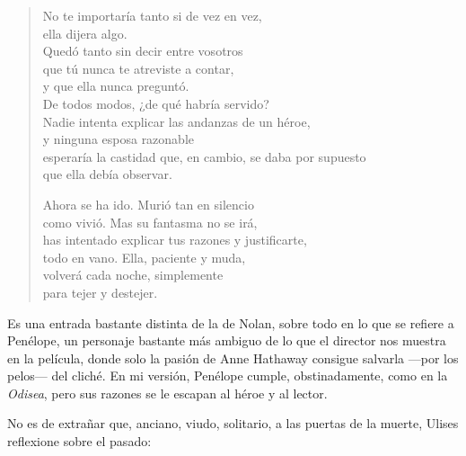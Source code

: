 \documentclass[11pt,a4paper]{article}
\begin{document}
\begin{verse}
No te importaría tanto si de vez en vez,\\
ella dijera algo.\\
Quedó tanto sin decir entre vosotros\\
que tú nunca te atreviste a contar,\\
y que ella nunca preguntó.\\
De todos modos, ¿de qué habría servido?\\
Nadie intenta explicar las andanzas de un héroe,\\
y ninguna esposa razonable\\
esperaría la castidad que, en cambio, se daba por supuesto\\
que ella debía observar.

Ahora se ha ido. Murió tan en silencio\\
como vivió. Mas su fantasma no se irá,\\
has intentado explicar tus razones y justificarte,\\
todo en vano. Ella, paciente y muda,\\
volverá cada noche, simplemente\\
para tejer y destejer.
\end{verse}


Es una entrada bastante distinta de la de Nolan, sobre todo en lo que se refiere a Penélope, un personaje bastante más ambiguo de lo que el director nos muestra en la película, donde solo la pasión de Anne Hathaway consigue salvarla ---por los pelos--- del cliché. En mi versión, Penélope cumple, obstinadamente, como en la \emph{Odisea}, pero sus razones se le escapan al héroe y al lector.

No es de extrañar que, anciano, viudo, solitario, a las puertas de la muerte, Ulises reflexione sobre el pasado:
\end{document}

